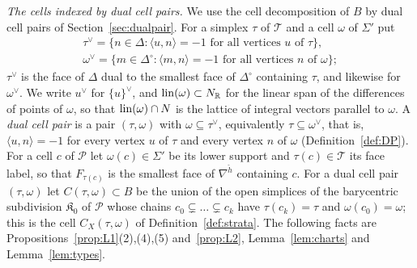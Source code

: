 \emph{The cells indexed by dual cell pairs.} We use the cell decomposition of $B$ by dual cell pairs of Section~\ref{sec:dualpair}. For a
simplex $\tau$ of $\mathcal T$ and a cell $\omega$ of $\Sigma'$ put
\begin{gather*}
\tau^\vee=\{n\in\Delta:\langle u,n\rangle=-1\text{ for all vertices $u$ of $\tau$}\},\\
\omega^\vee=\{m\in\Delta^\circ:\langle m,n\rangle=-1\text{ for all vertices $n$ of $\omega$}\};
\end{gather*}
$\tau^\vee$ is the face of $\Delta$ dual to the smallest face of $\Delta^\circ$ containing $\tau$, and likewise for $\omega^\vee$.
We write $u^\vee$ for $\{u\}^\vee$, and $\operatorname{lin}(\omega)\subset N_\mathbb R$ for the linear span of the differences of points of
$\omega$, so that $\operatorname{lin}(\omega)\cap N$ is the lattice of integral vectors parallel to $\omega$. A \emph{dual cell pair} is a pair
$(\tau,\omega)$ with $\omega\subseteq\tau^\vee$, equivalently $\tau\subseteq\omega^\vee$, that is, $\langle u,n\rangle=-1$ for
every vertex $u$ of $\tau$ and every vertex $n$ of $\omega$ (Definition~\ref{def:DP}). For
a cell $c$ of $\mathscr P$ let $\omega(c)\in\Sigma'$ be its lower support and $\tau(c)\in\mathcal T$ its face label, so that
$F_{\tau(c)}$ is the smallest face of $\nabla^{\check h}$ containing $c$. For a dual cell pair $(\tau,\omega)$ let
$C(\tau,\omega)\subset B$ be the union of the open simplices of the barycentric subdivision $\mathfrak K_0$ of $\mathscr P$
whose chains $c_0\subsetneq\dots\subsetneq c_k$ have $\tau(c_k)=\tau$ and $\omega(c_0)=\omega$; this is the cell
$C_X(\tau,\omega)$ of Definition~\ref{def:strata}. The following facts are
Propositions~\ref{prop:L1}(2),(4),(5) and~\ref{prop:L2}, Lemma~\ref{lem:charts} and Lemma~\ref{lem:types}.
